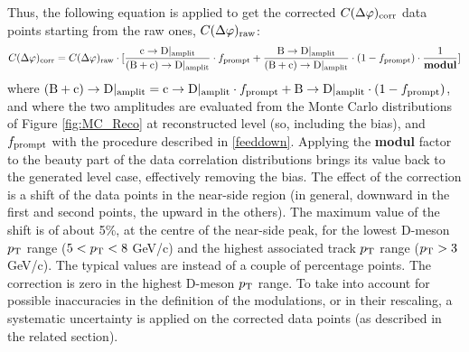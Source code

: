 Thus, the following equation is applied to get the corrected $C(\Delta\varphi)_{\rm corr}$ data points starting from the raw ones, $C(\Delta\varphi)_{\rm raw}$:
\begin{equation}
C(\Delta\varphi)_{\rm corr} = C(\Delta\varphi)_{\rm raw} \cdot [\frac{{\rm c}\rightarrow{\rm D}|_{\rm amplit}}{{\rm (B+c)}\rightarrow{\rm D}|_{\rm amplit}} \cdot f_{\rm prompt} + \frac{{\rm B}\rightarrow{\rm D}|_{\rm amplit}}{{\rm (B+c)}\rightarrow{\rm D}|_{\rm amplit}} \cdot (1-f_{\rm prompt})\cdot\frac{1}{\bf modul}]
\end{equation}
where ${\rm (B+c)}\rightarrow{\rm D}|_{\rm amplit} = {\rm c}\rightarrow{\rm D}|_{\rm amplit} \cdot f_{\rm prompt} + {\rm B}\rightarrow{\rm D}|_{\rm amplit} \cdot (1-f_{\rm prompt})$, and where the two amplitudes are evaluated from the Monte Carlo distributions of Figure \ref{fig:MC_Reco} at reconstructed level (so, including the bias), and $f_{\rm prompt}$ with the procedure described in \ref{feeddown}.
Applying the {\bf modul} factor to the beauty part of the data correlation distributions brings its value back to the generated level case, effectively removing the bias.
The effect of the correction is a shift of the data points in the near-side region (in general, downward in the first and second points, the upward in the others). The maximum value of the shift is of about 5\%, at the centre of the near-side peak, for the lowest D-meson $p_{\rm T}$ range ($5 < p_{\rm T} < 8$ GeV/c) and the highest associated track $p_{\rm T}$ range ($p_{\rm T} > 3$ GeV/c). The typical values are instead of a couple of percentage points. The correction is zero in the highest D-meson $p_{\rm T}$ range.
To take into account for possible inaccuracies in the definition of the modulations, or in their rescaling, a systematic uncertainty is  applied on the corrected data points (as described in the related section).

\clearpage
%

